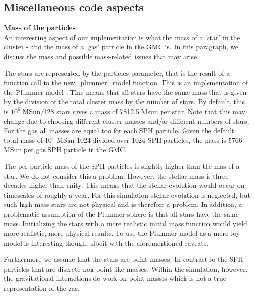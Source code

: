 \documentclass{aa}
\begin{document}


\subsection{Miscellaneous code aspects} \label{sec:code}
\noindent \textbf{Mass of the particles} \\
An interesting aspect of our implementation is what the mass of a `star' in the cluster - and the mass of a `gas' particle in the GMC is. In this paragraph, we discuss the mass and possible mass-related issues that may arise.

The stars are represented by the particles parameter, that is the result of a function call to the new\_plummer\_model function. This is an implementation of the Plummer model \citep{1911MNRAS..71..460P}. This means that all stars have the same mass that is given by the division of the total cluster mass by the number of stars. By default, this is $10^6$ MSun/128 stars gives a mass of 7812.5 Msun per star. Note that this may change due to choosing different cluster masses and/or different numbers of stars. For the gas all masses are equal too for each SPH particle. Given the default total mass of $10^7$ MSun 1024 divided over 1024 SPH particles, the mass is \~9766 MSun per gas SPH particle in the GMC. 

The per-particle mass of the SPH particles is slightly higher than the mas of a star. We do not consider this a problem. However, the stellar mass is three decades higher than unity. This means that the stellar evolution would occur on timescales of roughly a year. For this simulation stellar evolution is neglected, but such high mass stars are not physical and is therefore a problem. In addition, a problematic assumption of the Plummer sphere is that all stars have the same mass. Initializing the stars with a more realistic initial mass function would yield more realistic, more physical results. To use the Plummer model as a mere toy model is interesting though, albeit with the aforementioned caveats.

Furthermore we assume that the stars are point masses. In contrast to the SPH particles that are discrete non-point like masses. Within the simulation, however, the gravitational interactions do work on point masses which is not a true representation of the gas. \\
\end{document}
